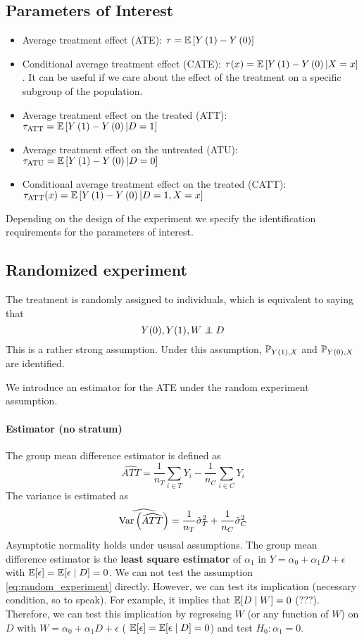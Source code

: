 \subsection{Parameters of Interest}
\begin{itemize}
    \item Average treatment effect (ATE): $\tau = \mathbb{E}\left[Y\left(1\right)-Y\left(0\right)\right]$
    \item Conditional average treatment effect (CATE): $\tau(x) =
              \mathbb{E}\left[Y\left(1\right)-Y\left(0\right)|X=x\right]$. It can be useful if we care about the effect of
          the treatment on a specific subgroup of the population.
    \item Average treatment effect on the treated (ATT): $\tau_{\text{ATT}} =
              \mathbb{E}\left[Y\left(1\right)-Y\left(0\right)|D=1\right]$
    \item Average treatment effect on the untreated (ATU): $\tau_{\text{ATU}} =
              \mathbb{E}\left[Y\left(1\right)-Y\left(0\right)|D=0\right]$
    \item Conditional average treatment effect on the treated (CATT):
          $\tau_{\text{ATT}}(x) = \mathbb{E}\left[Y\left(1\right)-Y\left(0\right)|D=1,X=x\right]$
\end{itemize}

Depending on the design of the experiment we specify the identification
requirements for the parameters of interest.

\subsection{Randomized experiment}
The treatment is randomly assigned to individuals, which is equivalent to
saying that \begin{equation}\label{eq:random_experiment}
    Y(0),Y(1),W \perp\!\!\!\!\perp D
\end{equation}
This is a rather strong assumption. Under this assumption, $\mathbb{P}_{Y(1),X}$ and $\mathbb{P}_{Y(0),X}$ are identified.

We introduce an estimator for the ATE under the random experiment assumption.
\paragraph{Estimator (no stratum)} The group mean difference estimator is defined
as
\begin{equation*}
    \widehat{ATT}=\frac{1}{n_T}\sum_{i\in T} Y_i-\frac{1}{n_C}\sum_{i\in C} Y_i
\end{equation*}
The variance is estimated as
\begin{equation*}
    \widehat{\text{Var}\left(\widehat{ATT}\right)}=\frac{1}{n_T}\hat{\sigma}_T^2+\frac{1}{n_C}\hat{\sigma}_C^2
\end{equation*}
Asymptotic normality holds under ususal assumptions.
The group mean difference estimator is the \textbf{least square estimator} of $\alpha_1$ in $Y=\alpha_0+\alpha_1D+\epsilon$ with $\mathbb{E}[\epsilon]=\mathbb{E}[\epsilon\mid D]=0$.
We can not test the assumption \ref{eq:random_experiment} directly. However, we can test its implication (necessary condition, so to speak). For example, it implies that $\mathbb{E}[D\mid W]=0$ (???). Therefore, we can test this implication by regressing $W$ (or any function of $W$) on $D$ with $W=\alpha_0+\alpha_1 D+\epsilon$ ( $\mathbb{E}[\epsilon]=\mathbb{E}[\epsilon\mid D]=0$) and test $H_0:\alpha_1=0$.
